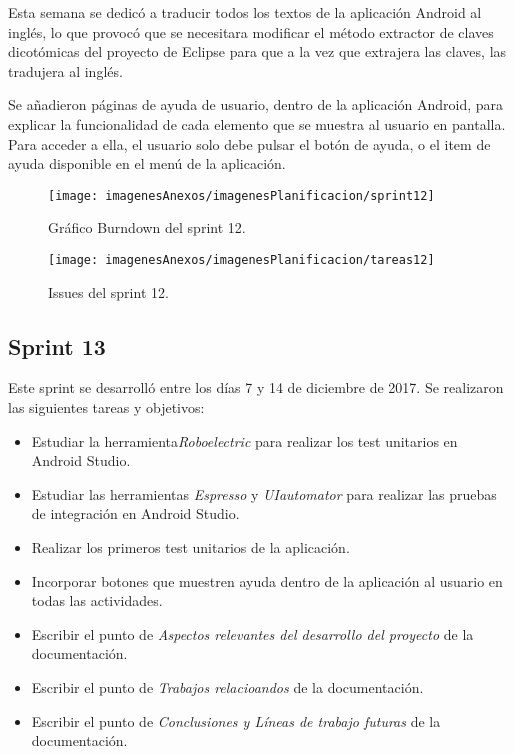 Esta semana se dedicó a traducir todos los textos de la aplicación Android al inglés, lo que provocó que se necesitara modificar el método extractor de claves dicotómicas del proyecto de Eclipse para que a la vez que extrajera las claves, las tradujera al inglés.

Se añadieron páginas de ayuda de usuario, dentro de la aplicación Android, para explicar la funcionalidad de cada elemento que se muestra al usuario en pantalla. Para acceder a ella, el usuario solo debe pulsar el botón de ayuda, o el item de ayuda disponible en el menú de la aplicación.

\begin{figure}[h]
    \begin{center}%
        \begin{center}%
          \texttt{[image: imagenesAnexos/imagenesPlanificacion/sprint12]}%
          \caption{Gráfico Burndown del sprint 12.}%
          \label{figSprint12}%
        \end{center}%
  	\end{center}%
\end{figure}%

\begin{figure}[h]
    \begin{center}%
        \begin{center}%
          \texttt{[image: imagenesAnexos/imagenesPlanificacion/tareas12]}%
          \caption{Issues del sprint 12.}%
          \label{figTareas12}%
        \end{center}%
  	\end{center}%
\end{figure}%

\newpage

\subsection{Sprint 13}

Este sprint se desarrolló entre los días 7 y 14 de diciembre de 2017. Se realizaron las siguientes tareas y objetivos:

\begin{itemize}
	\item Estudiar la herramienta\textit{Roboelectric} para realizar los test unitarios en Android Studio.
	\item Estudiar las herramientas \textit{Espresso} y \textit{UIautomator} para realizar las pruebas de integración en Android Studio. 
	\item Realizar los primeros test unitarios de la aplicación.
	\item Incorporar botones que muestren ayuda dentro de la aplicación al usuario en todas las actividades.
	\item Escribir el punto de \textit{Aspectos relevantes del desarrollo
del proyecto} de la documentación.
	\item Escribir el punto de \textit{Trabajos relacioandos} de la documentación.
	\item Escribir el punto de \textit{Conclusiones y Líneas de trabajo
futuras} de la documentación.
\end{itemize}

